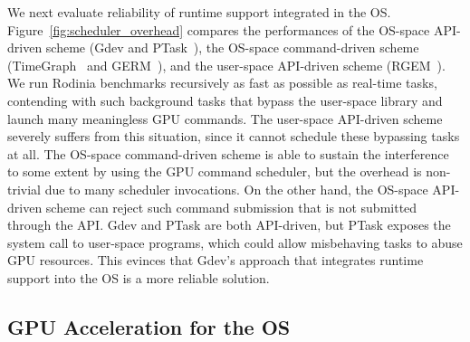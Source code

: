 We next evaluate reliability of runtime support integrated in the OS.
Figure~\ref{fig:scheduler_overhead} compares the performances of the
OS-space API-driven scheme (Gdev and PTask~\cite{Rossbach_SOSP11}),
the OS-space command-driven scheme (TimeGraph~\cite{Kato_ATC11} and
GERM~\cite{Bautin_MCNC08}), and the user-space API-driven scheme
(RGEM~\cite{Kato_RTSS11}).
We run Rodinia benchmarks recursively as fast as possible as
real-time tasks, contending with such background tasks that bypass the
user-space library and launch many meaningless GPU commands.
The user-space API-driven scheme severely suffers from this situation,
since it cannot schedule these bypassing tasks at all.
The OS-space command-driven scheme is able to sustain the interference
to some extent by using the GPU command scheduler, but the overhead is
non-trivial due to many scheduler invocations.
On the other hand, the OS-space API-driven scheme can reject such command
submission that is not submitted through the API.
Gdev and PTask are both API-driven, but PTask exposes the system call to
user-space programs, which could allow misbehaving tasks to abuse GPU
resources.
This evinces that Gdev's approach that integrates runtime support into
the OS is a more reliable solution.

\vspace{-0.25em}
\subsection{GPU Acceleration for the OS}
\vspace{-0.25em}


